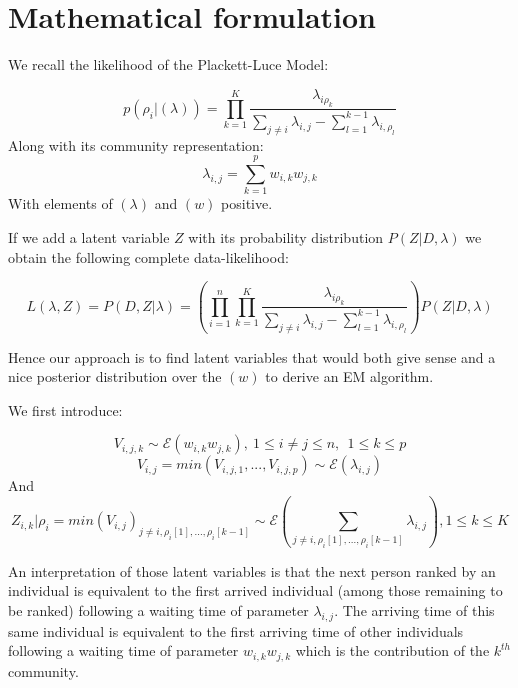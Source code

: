 \documentclass[12pt]{ociamthesis}  %
\begin{document}
	\section{Mathematical formulation}
	
	We recall the likelihood of the Plackett-Luce Model:
	
	\begin{equation}
	p(\rho_{i} | (\lambda)) = \prod_{k = 1}^{K}\frac{\lambda_{i\rho_{k}}}{\sum_{j \neq i}\lambda_{i,j} - \sum_{l = 1}^{k - 1}\lambda_{i,\rho_{l}}}
	\end{equation}
	Along with its community representation:
	\begin{equation}
	\lambda_{i,j} = \sum_{k = 1}^{p} w_{i,k} w_{j,k}
	\end{equation}
	With elements of $(\lambda)$ and $(w)$ positive.
	
	If we add a latent variable $Z$ with its probability distribution $P(Z | D, \lambda)$ we obtain the following complete data-likelihood:
	
	\begin{equation}
	L(\lambda,Z) = P(D,Z | \lambda) = (\prod_{i = 1}^{n}\prod_{k = 1}^{K}\frac{\lambda_{i\rho_{k}}}{\sum_{j \neq i}\lambda_{i,j} - \sum_{l = 1}^{k - 1}\lambda_{i,\rho_{l}}})P(Z | D, \lambda)
	\end{equation}
	
	Hence our approach is to find latent variables that would both give sense and a nice posterior distribution over the $(w)$ to derive an EM algorithm.
	
	We first introduce:
	
	\begin{equation}
	V_{i,j,k} \sim \mathcal{E}(w_{i,k}w_{j,k}), \ 1 \leq i \neq j \leq n, \ \ 1 \leq k \leq p
	\end{equation}
	\begin{equation}
	V_{i,j} = min(V_{i,j,1},...,V_{i,j,p}) \sim \mathcal{E}(\lambda_{i,j})
	\end{equation}
	And
	\begin{equation}
	Z_{i,k} | \rho_{i} = min(V_{i,j})_{j \neq i, \rho_{i}[1],...,\rho_{i}[k-1]} \sim \mathcal{E}(\sum_{j \neq i, \rho_{i}[1],...,\rho_{i}[k-1]}\lambda_{i,j}), 1 \leq k \leq K
	\end{equation}
	
	An interpretation of those latent variables is that the next person ranked by an individual is equivalent to the first arrived individual (among those remaining to be ranked) following a waiting time of parameter $\lambda_{i,j}$. The arriving time of this same individual is equivalent to the first arriving time of other individuals following a waiting time of parameter $w_{i,k}w_{j,k}$ which is the contribution of the $k^{th}$ community.
	
\end{document}
